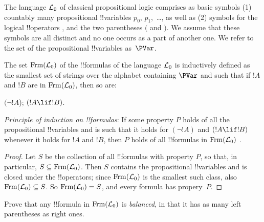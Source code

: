 \documentclass[../../include/open-logic-section]{subfiles}
\begin{document}


The language $\mathcal L_0$ of classical propositional logic
comprises as basic symbols (1) countably many propositional !!{variable}s
$p_0$, $p_1$,~\dots, as well as (2) symbols for the logical !!{operator}s
  \startycommalist
  ,
 and the two parentheses $($ and
$)$. We assume that these symbols are all distinct and no one occurs as
a part of another one. We refer to the set of the propositional
!!{variable}s as~$\PVar$.

\begin{defn} [Formulas]
The set $\Frm[L_0]$ of the !!{formula}s of the language
  $\mathcal L_0$ is inductively defined as the smallest set of strings
  over the alphabet containing $\PVar$ and such that
  if $!A$ and $!B$ are in $\Frm[L_0]$, then so are:
\begin{enumerate}
 {$(\lnot !A$);}{}
 {$(!A \lif !B)$.}{}
\end{enumerate}
\end{defn}     
                        
\begin{thm} 
\emph{Principle of induction on !!{formula}s}: If some
  property $P$ holds of all the propositional !!{variable}s and is such
  that it holds for $(\lnot !A)$ and $(!A \lif !B)$
  whenever it holds for $!A$ and $!B$, then $P$ holds of all
 !!{formula}s in $\Frm[L_0]$ .
\end{thm}

\begin{proof}
  Let $S$ be the collection of all !!{formula}s with property $P$, so
  that, in particular, $S \subseteq \Frm[L_0]$. Then $S$ contains
  the propositional !!{variable}s and is closed under the !!{operator}s;
  since $\Frm[L_0]$ is the smallest such class, also
  $\Frm[L_0]\subseteq S$. So $\Frm[L_0] = S$, and every
  formula has propery~$P$.
\end{proof}

\begin{prob} 
Prove that any !!{formula} in $\Frm[L_0]$ is \emph{balanced}, in
that it has as many left parentheses as right ones.
\end{prob}
\end{document}

